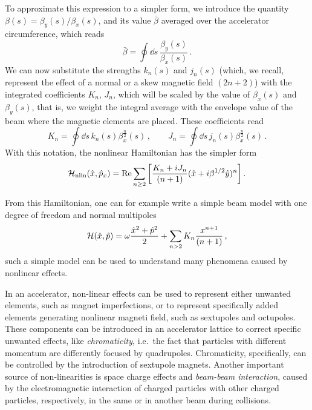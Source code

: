 To approximate this expression to a simpler form, we introduce the quantity $\beta(s)=\beta_y(s)/\beta_x(s)$, and its value $\bar\beta$ averaged over the accelerator circumference, which reads
\begin{equation}
    \bar\beta = \oint \dd s\, \frac{\beta_y(s)}{\beta_x(s)} \,.
\end{equation}
We can now substitute the strengths $k_n(s)$ and $j_n(s)$ (which, we recall, represent the effect of a normal or a skew magnetic field $(2n+2)$) with the integrated coefficients $K_n$, $J_n$, which will be scaled by the value of $\beta_x(s)$ and $\beta_y(s)$, that is, we weight the integral average with the envelope value of the beam where the magnetic elements are placed. These coefficients read
%
\begin{equation} 
	K_n = \oint \dd s\, k_n(s) \beta_x^{\frac{n}{2}}(s)\,,\qquad
	J_n = \oint \dd s\, j_n(s) \beta_x^{\frac{n}{2}}(s)\,.
\end{equation} 
%
With this notation, the nonlinear Hamiltonian has the simpler form
% 
\begin{equation} \ham_\text{nlin}(\hat x, \hat p_x) = \Re \sum_{n\ge 2} \qty[\frac{K_n + iJ_n}{(n+1)} (\hat x + i\bar\beta^{1/2} \hat y)^n]\,.\end{equation}

From this Hamiltonian, one can for example write a simple beam model with one degree of freedom and normal multipoles
\begin{equation}
	\mathcal{H}(\hat x,\hat p) = \omega \frac{\hat x^2 + \hat p^2}{2} + \sum_{n>2} K_n \frac{x^{n+1}}{(n+1)}\, ,
	\label{eq:hamxp_nl}
\end{equation}
such a simple model can be used to understand many phenomena caused by nonlinear effects.

In an accelerator, non-linear effects can be used to represent either unwanted elements, such as magnet imperfections, or to represent specifically added elements generating nonlinear magneti field, such as sextupoles and octupoles. These components can be introduced in an accelerator lattice to correct specific unwanted effects, like \textit{chromaticity}, i.e.\ the fact that particles with different momentum are differently focused by quadrupoles. Chromaticity, specifically, can be controlled by the introduction of sextupole magnets. Another important source of non-linearities is space charge effects and \textit{beam-beam interaction}, caused by the electromagnetic interaction of charged particles with other charged particles, respectively, in the same or in another beam during collisions.

